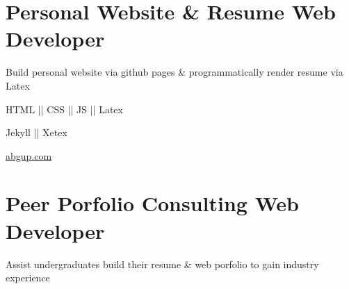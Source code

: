\section{
    \textbf{Personal Website \& Resume} \newline
    Web Developer
}{}

\vspace{-2.5ex}

\begin{detail}
    \BulletItem
    Build personal website via github pages \& programmatically render resume via Latex

\end{detail}

\begin{subtitle}
    \vspace{-5ex}
    {{}} 
\end{subtitle}

\vspace{-1.5ex}
{
    \vspace{-0.8ex}
    \color{cyan}\small
    {HTML || CSS || JS || Latex}
}

{
    \vspace{-2.5ex}\hspace{1.5in}
    \color{cyan}\small
    {Jekyll || Xetex}
}

{
    \vspace{-2.5ex}\hspace{3in}
    \color{blue}\small
    {\href{https://abgup.com}{abgup.com}{}}
}

\vspace{0.5ex}


\section{
    \textbf{Peer Porfolio Consulting} \newline
    Web Developer
}{}


\vspace{-2.5ex}

\begin{detail}
    \BulletItem
    Assist undergraduates build their resume \& web porfolio to gain industry experience
\end{detail}

\begin{subtitle}
    \vspace{-5ex}
    {{}} 
\end{subtitle}

